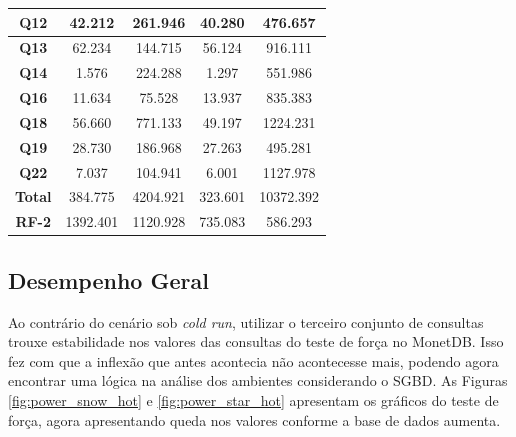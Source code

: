 \begin{table}[t]
\begin{tabular}{|c|c|c|c|c|}
                 \textbf{Q12}         & 42.212            & 261.946                       & 40.280            & 476.657                   \\ 
                \hline
                 \textbf{Q13}         & 62.234            & 144.715                       & 56.124            & 916.111                   \\ 
                \hline
                 \textbf{Q14}         & 1.576             & 224.288                       & 1.297             & 551.986                   \\ 
                \hline
                 \textbf{Q16}         & 11.634            & 75.528                        & 13.937            & 835.383                   \\ 
                \hline
                 \textbf{Q18}         & 56.660            & 771.133                       & 49.197            & 1224.231                  \\ 
                \hline
                 \textbf{Q19}         & 28.730            & 186.968                       & 27.263            & 495.281                   \\ 
                \hline
                 \textbf{Q22}         & 7.037             & 104.941                       & 6.001             & 1127.978                  \\ 
                \hline
                 \textbf{Total}       & 384.775           & 4204.921                      & 323.601           & 10372.392                 \\ 
                \hline
                 \textbf{RF-2}        & 1392.401          & 1120.928                      & 735.083           & 586.293                   \\
                \hline
                \end{tabular}
                \end{table}

\subsection{Desempenho Geral}

Ao contrário do cenário sob \textit{cold run}, utilizar o terceiro conjunto de consultas trouxe estabilidade nos valores das consultas do teste de força no MonetDB. Isso fez com que a inflexão que antes acontecia não acontecesse mais, podendo agora encontrar uma lógica na análise dos ambientes considerando o SGBD. As Figuras \ref{fig:power_snow_hot} e \ref{fig:power_star_hot} apresentam os gráficos do teste de força, agora apresentando queda nos valores conforme a base de dados aumenta.

